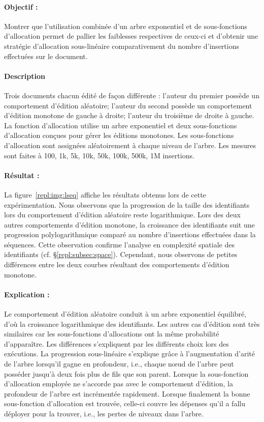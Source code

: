 \paragraph{Objectif :} Montrer que l'utilisation combinée d'un arbre exponentiel
et de sous-fonctions d'allocation permet de pallier les faiblesses respectives
de ceux-ci et d'obtenir une stratégie d'allocation sous-linéaire comparativement
du nombre d'insertions effectuées sur le document. 

\paragraph{Description} Trois documents chacun édité de façon différente :
l'auteur du premier possède un comportement d'édition aléatoire; l'auteur du
second possède un comportement d'édition monotone de gauche à droite; l'auteur
du troisième de droite à gauche. La fonction d'allocation utilise un arbre
exponentiel et deux sous-fonctions d'allocation conçues pour gérer les éditions
monotones. Les sous-fonctions d'allocation sont assignées aléatoirement à chaque
niveau de l'arbre. Les mesures sont faites à 100, 1k, 5k, 10k, 50k, 100k, 500k,
1M insertions.

\paragraph{Résultat :} La figure~\ref{repl:img:lseq} affiche les résultats
obtenus lors de cette expérimentation. Nous observons que la progression de la
taille des identifiants lors du comportement d'édition aléatoire reste
logarithmique. Lors des deux autres comportements d'édition monotone, la
croissance des identifiants suit une progression polylogarithmique comparé au
nombre d'insertions effectuées dans la séquences. Cette observation confirme
l'analyse en complexité spatiale des identifiants
(cf. §\ref{repl:subsec:space}). Cependant, nous observons de petites
différences entre les deux courbes résultant des comportements d'édition monotone.

\paragraph{Explication :} Le comportement d'édition aléatoire conduit à un arbre
exponentiel équilibré, d'où la croissance logarithmique des identifiants. Les
autres cas d'édition sont très similaires car les sous-fonctions d'allocations
ont la même probabilité d'apparaître. Les différences s'expliquent par les
différents choix lors des exécutions. La progression sous-linéaire s'explique
grâce à l'augmentation d'arité de l'arbre lorsqu'il gagne en profondeur, i.e.,
chaque nœud de l'arbre peut posséder jusqu'à deux fois plus de fils que son
parent. Lorsque la sous-fonction d'allocation employée ne s'accorde pas avec le
comportement d'édition, la profondeur de l'arbre est incrémentée
rapidement. Lorsque finalement la bonne sous-fonction d'allocation est trouvée,
celle-ci couvre les dépenses qu'il a fallu déployer pour la trouver, i.e., les
pertes de niveaux dans l'arbre.

